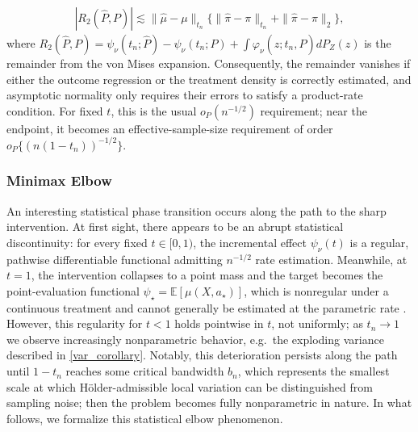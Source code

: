 \documentclass[11pt,twoside]{article}
\theoremstyle{definition}
\theoremstyle{remark}
\begin{document}
\begin{align*}
    |R_2(\widehat P,P)| \lesssim \|\widehat\mu-\mu\|_{t_n} \Big\{ \|\widehat\pi-\pi\|_{t_n} + \|\widehat\pi-\pi\|_2 \Big\},
\end{align*}
where $ R_2(\widehat{P}, P) = \psi_{\nu}(t_n; \widehat{P}) - \psi_{\nu}(t_n; P) + \int \varphi_{\nu}(z; t_n, \widehat{P}) dP_Z(z)$ is the remainder from the von Mises expansion. Consequently, the remainder vanishes if either the outcome regression or the treatment density is correctly estimated, and asymptotic normality only requires their errors to satisfy a product-rate condition. For fixed $t$, this is the usual $o_P(n^{-1/2})$ requirement; near the endpoint, it becomes an effective-sample-size requirement of order $o_P\{(n(1-t_n))^{-1/2}\}$.

\subsubsection{Minimax Elbow}

An interesting statistical phase transition occurs along the path to the sharp intervention. At first sight, there appears to be an abrupt statistical discontinuity: for every fixed $t \in [0, 1)$, the incremental effect $\psi_\nu(t)$ is a regular, pathwise differentiable functional admitting $n^{-1/2}$ rate estimation. Meanwhile, at $t=1$, the intervention collapses to a point mass and the target becomes the point-evaluation functional $\psi_\star=\mathbb{E}[\mu(X,a_\star)]$, which is nonregular under a continuous treatment and cannot generally be estimated at the parametric rate \citep{diaz2013targeted, kennedy2017cte}. However, this regularity for $t < 1$ holds pointwise in $t$, not uniformly; as $t_n \to 1$ we observe increasingly nonparametric behavior, e.g.\ the exploding variance described in \cref{var_corollary}. Notably, this deterioration persists along the path until $1 - t_n$ reaches some critical bandwidth $b_n$, which represents the smallest scale at which H\"older-admissible local variation can be distinguished from sampling noise; then the problem becomes fully nonparametric in nature. In what follows, we formalize this statistical elbow phenomenon. 
\end{document}
